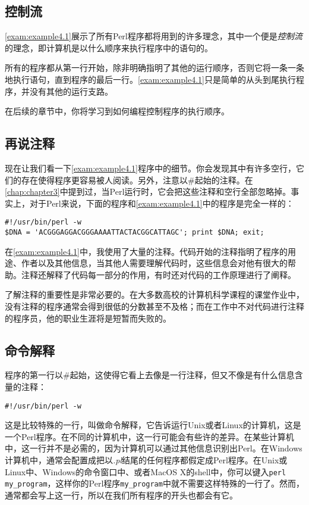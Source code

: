 \subsection{控制流}
\autoref{exam:example4.1}展示了所有Perl程序都将用到的许多理念，其中一个便是\textit{控制流}的理念，即计算机是以什么顺序来执行程序中的语句的。

所有的程序都从第一行开始，除非明确指明了其他的运行顺序，否则它将一条一条地执行语句，直到程序的最后一行。\autoref{exam:example4.1}只是简单的从头到尾执行程序，并没有其他的运行支路。

在后续的章节中，你将学习到如何编程控制程序的执行顺序。

\subsection{再说注释}
现在让我们看一下\autoref{exam:example4.1}程序中的细节。你会发现其中有许多空行，它们的存在使得程序更容易被人阅读。另外，注意以\#起始的注释。在\autoref{chap:chapter3}中提到过，当Perl运行时，它会把这些注释和空行全部忽略掉。事实上，对于Perl来说，下面的程序和\autoref{exam:example4.1}中的程序是完全一样的：

\begin{lstlisting}
#!/usr/bin/perl -w
$DNA = 'ACGGGAGGACGGGAAAATTACTACGGCATTAGC'; print $DNA; exit;
\end{lstlisting}

在\autoref{exam:example4.1}中，我使用了大量的注释。代码开始的注释指明了程序的用途、作者以及其他信息，当其他人需要理解代码时，这些信息会对他有很大的帮助。注释还解释了代码每一部分的作用，有时还对代码的工作原理进行了阐释。

了解注释的重要性是非常必要的。在大多数高校的计算机科学课程的课堂作业中，没有注释的程序通常会得到很低的分数甚至不及格；而在工作中不对代码进行注释的程序员，他的职业生涯将是短暂而失败的。

\subsection{命令解释}
\label{sec:section4.2.3}
程序的第一行以\#起始，这使得它看上去像是一行注释，但又不像是有什么信息含量的注释：

\begin{lstlisting}
#!/usr/bin/perl -w
\end{lstlisting}

这是比较特殊的一行，叫做命令解释，它告诉运行Unix或者Linux的计算机，这是一个Perl程序。在不同的计算机中，这一行可能会有些许的差异。在某些计算机中，这一行并不是必需的，因为计算机可以通过其他信息识别出Perl。在Windows计算机中，通常会配置成把以\textit{.pl}结尾的任何程序都假定成Perl程序。在Unix或Linux中、Windows的命令窗口中、或者MacOS X的shell中，你可以键入\verb|perl my_program|，这样你的Perl程序\verb|my_program|中就不需要这样特殊的一行了。然而，通常都会写上这一行，所以在我们所有程序的开头也都会有它。


